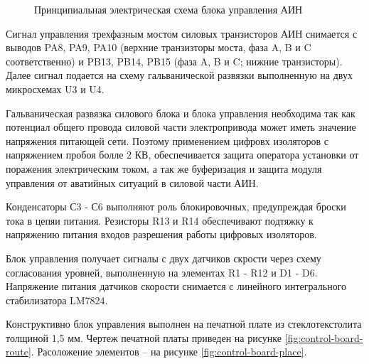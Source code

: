         \begin{figure}
            \caption{Принципиальная электрическая схема блока управления АИН}
            \label{fig:control-schematic}
        \end{figure}

        Сигнал управления трехфазным мостом силовых транзисторов АИН снимается
        с выводов PA8, PA9, PA10 (верхние транзизторы моста, фаза A, B и C
        соответственно) и PB13, PB14, PB15 (фаза A, B и C; нижние транзисторы).
        Далее сигнал подается на схему гальванической развязки выполненную на
        двух микросхемах U3 и U4. 
        
        Гальваническая развязка силового блока и блока управления необходима
        так как потенциал общего провода силовой части электропривода может
        иметь значение напряжения питающей сети. Поэтому применением цифровх
        изоляторов с напряжением пробоя болле 2 КВ, обеспечивается защита
        оператора установки от поражения электрическим током, а так же
        буферизация и защита модуля управления от аватийных ситуаций в силовой
        части АИН.

        Конденсаторы С3 - С6 выполняют роль блокировочных, предупреждая броски
        тока в цепяи питания. Резисторы R13 и R14 обеспечивают подтяжку к
        напряжению питания входов разрешения работы цифровых изоляторов.

        Блок управления получает сигналы с двух датчиков скрости через схему
        согласования уровней, выполненную на элементах R1 - R12 и D1 - D6.
        Напряжение питания датчиков скорости снимается с линейного
        интегрального стабилизатора LM7824.

        Конструктивно блок управления выполнен на печатной плате из
        стеклотекстолита толщиной 1,5 мм. Чертеж печатной платы приведен на
        рисунке \ref{fig:control-board-route}. Расоложение элементов -- на
        рисунке \ref{fig:control-board-place}.


